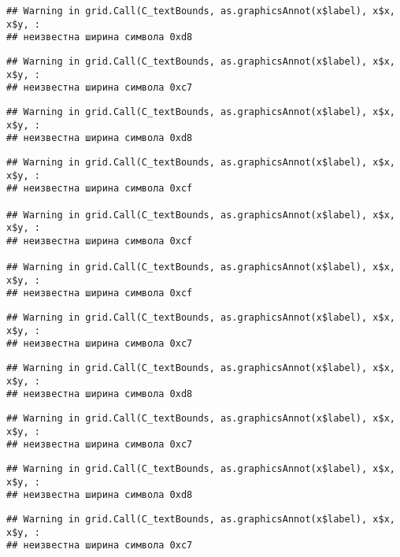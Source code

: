 \documentclass[
]{article}
\begin{document}
\begin{verbatim}
## Warning in grid.Call(C_textBounds, as.graphicsAnnot(x$label), x$x, x$y, :
## неизвестна ширина символа 0xd8
\end{verbatim}

\begin{verbatim}
## Warning in grid.Call(C_textBounds, as.graphicsAnnot(x$label), x$x, x$y, :
## неизвестна ширина символа 0xc7
\end{verbatim}

\begin{verbatim}
## Warning in grid.Call(C_textBounds, as.graphicsAnnot(x$label), x$x, x$y, :
## неизвестна ширина символа 0xd8
\end{verbatim}

\begin{verbatim}
## Warning in grid.Call(C_textBounds, as.graphicsAnnot(x$label), x$x, x$y, :
## неизвестна ширина символа 0xcf

## Warning in grid.Call(C_textBounds, as.graphicsAnnot(x$label), x$x, x$y, :
## неизвестна ширина символа 0xcf

## Warning in grid.Call(C_textBounds, as.graphicsAnnot(x$label), x$x, x$y, :
## неизвестна ширина символа 0xcf
\end{verbatim}

\begin{verbatim}
## Warning in grid.Call(C_textBounds, as.graphicsAnnot(x$label), x$x, x$y, :
## неизвестна ширина символа 0xc7
\end{verbatim}

\begin{verbatim}
## Warning in grid.Call(C_textBounds, as.graphicsAnnot(x$label), x$x, x$y, :
## неизвестна ширина символа 0xd8
\end{verbatim}

\begin{verbatim}
## Warning in grid.Call(C_textBounds, as.graphicsAnnot(x$label), x$x, x$y, :
## неизвестна ширина символа 0xc7
\end{verbatim}

\begin{verbatim}
## Warning in grid.Call(C_textBounds, as.graphicsAnnot(x$label), x$x, x$y, :
## неизвестна ширина символа 0xd8
\end{verbatim}

\begin{verbatim}
## Warning in grid.Call(C_textBounds, as.graphicsAnnot(x$label), x$x, x$y, :
## неизвестна ширина символа 0xc7
\end{verbatim}
\end{document}
